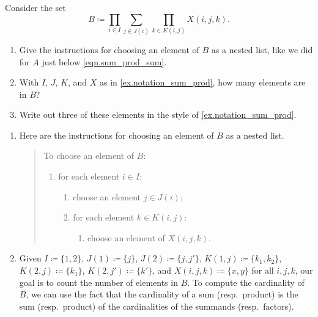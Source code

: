 \documentclass[Book-Poly]{subfiles}
\begin{document}
\begin{exercise}
    Consider the set
    \begin{equation}\label{eqn.prod_sum_prod}B \coloneqq \prod_{i\in I}\sum_{j\in J(i)}\prod_{k\in K(i,j)}X(i,j,k).\end{equation}
    \begin{enumerate}
        \item Give the instructions for choosing an element of $B$ as a nested list, like we did for $A$ just below \eqref{eqn.sum_prod_sum}.
        \item With $I$, $J$, $K$, and $X$ as in \cref{ex.notation_sum_prod}, how many elements are in $B$?
        \item Write out three of these elements in the style of \cref{ex.notation_sum_prod}.
        \qedhere
    \end{enumerate}
    \begin{solution}
        \begin{enumerate}
            \item Here are the instructions for choosing an element of $B$ as a nested list.
            \begin{quote}
                To choose an element of $B$:
                \begin{enumerate}[label=\arabic*.]
                    \item for each element $i \in I$:
                    \begin{enumerate}[label*=\arabic*.]
                        \item choose an element $j \in J(i)$;
                        \item for each element $k \in K(i, j)$:
                        \begin{enumerate}[label*=\arabic*.]
                            \item choose an element of $X(i,j,k)$.
                        \end{enumerate}
                    \end{enumerate}
                \end{enumerate}
            \end{quote}
            \item Given $I\coloneqq\{1,2\}$, $J(1)\coloneqq\{j\}$, $J(2)\coloneqq\{j,j'\}$, $K(1,j)\coloneqq\{k_1,k_2\}$, $K(2,j)\coloneqq\{k_1\}$, $K(2,j')\coloneqq\{k'\}$, and $X(i,j,k)\coloneqq\{x,y\}$ for all $i,j,k$, our goal is to count the number of elements in $B$.
            To compute the cardinality of $B$, we can use the fact that the cardinality of a sum (resp.\ product) is the sum (resp.\ product) of the cardinalities of the summands (resp.\ factors).

\end{enumerate}
\end{solution}
\end{exercise}
\end{document}

